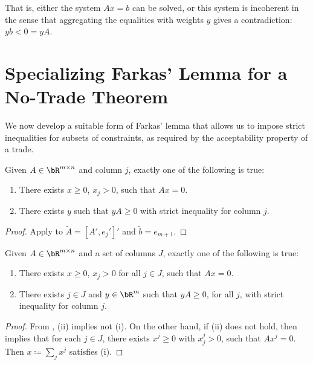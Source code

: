 That is, either the system \(Ax = b\) can be solved, or this system is incoherent in the sense that aggregating the equalities with weights \(y\) gives a contradiction: \(yb < 0 = yA\).

\section{Specializing Farkas' Lemma for a No-Trade Theorem}
We now develop a suitable form of Farkas' lemma that allows us to impose strict inequalities for subsets of constraints, as required by the acceptability property of a trade.

\begin{lemma}\label{lem:farkas-variant-1}
  Given \(A \in \bR^{m \times n}\) and column \(j\), exactly one of the following is true:
  \begin{enumerate}[label=(\roman*)]
    \item There exists \(x \geq 0\), \(x_j > 0\), such that \(Ax = 0\).
    \item There exists \(y\) such that \(yA \geq 0\) with strict inequality for column \(j\).
  \end{enumerate}
\end{lemma}
\begin{proof}
  Apply  to \(\tilde{A} = [A', e_j']'\) and \(\tilde{b} = e_{m + 1}\).
\end{proof}

\begin{lemma}\label{lem:farkas-variant-2}
  Given \(A \in \bR^{m \times n}\) and a set of columns \(J\), exactly one of the following is true:
  \begin{enumerate}[label=(\roman*)]
    \item There exists \(x \geq 0\), \(x_j > 0\) for all \(j \in J\), such that \(Ax = 0\).
    \item There exists \(j \in J\) and \(y \in \bR^m\) such that \(yA \geq 0\), for all \(j\), with strict inequality for column \(j\).
  \end{enumerate}
\end{lemma}
\begin{proof}
  From , (ii) implies not (i).
  On the other hand, if (ii) does not hold, then  implies that for each \(j \in J\), there exists \(x^j \geq 0\) with \(x_j^j > 0\), such that \(Ax^j = 0\).
  Then \(x \coloneq \sum_j x^j\) satisfies (i).
\end{proof}

